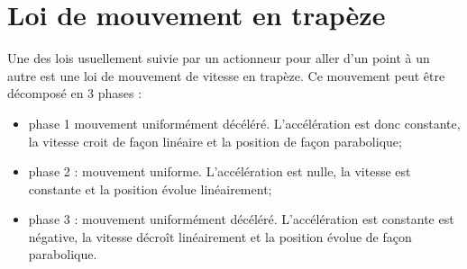%
%
%
%
%
%
\section{Loi de mouvement en trapèze}

Une des lois usuellement suivie par un actionneur pour aller d'un point à un autre est une loi de mouvement de vitesse en trapèze.  Ce mouvement peut être décomposé en 3 phases : 
\begin{itemize}
\item phase 1 mouvement uniformément décéléré. L'accélération est donc constante, la vitesse croit de façon linéaire et la position de façon parabolique;
\item phase 2 : mouvement uniforme. L'accélération est nulle, la vitesse est constante et la position évolue linéairement;
\item phase 3 : mouvement uniformément décéléré. L'accélération est constante est négative, la vitesse décroît linéairement et la position évolue de façon parabolique. 
\end{itemize}


